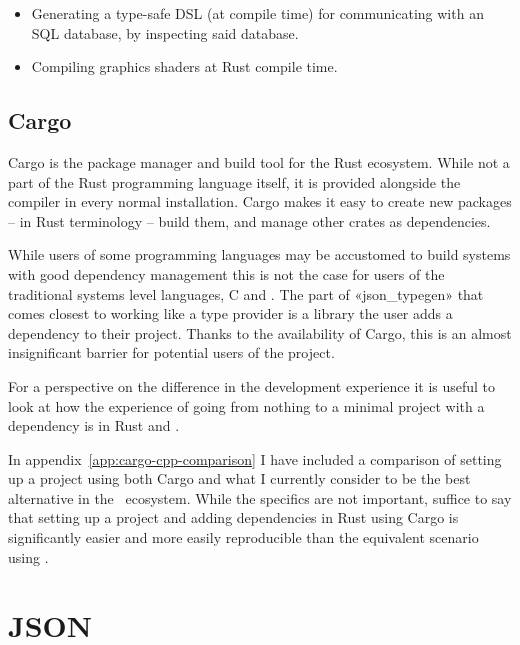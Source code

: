 \begin{itemize}
  \item Generating a type-safe DSL (at compile time) for communicating with an SQL database, by inspecting said database.\cite{diesel}
  \item Compiling graphics shaders at Rust compile time.\cite{vulkano}
\end{itemize}


\subsection{Cargo}

Cargo is the package manager and build tool for the Rust ecosystem. While not a part of the Rust programming language itself, it is provided alongside the compiler in every normal installation. Cargo makes it easy to create new packages --  in Rust terminology -- build them, and manage other crates as dependencies.

While users of some programming languages may be accustomed to build systems with good dependency management this is not the case for users of the traditional systems level languages, C and \cpp. The part of «json_typegen» that comes closest to working like a type provider is a library the user adds a dependency to their project. Thanks to the availability of Cargo, this is an almost insignificant barrier for potential users of the project.

For a perspective on the difference in the development experience it is useful to look at how the experience of going from nothing to a minimal project with a dependency is in Rust and \cpp.

In appendix~\ref{app:cargo-cpp-comparison} I have included a comparison of setting up a project using both Cargo and what I currently consider to be the best alternative in the \cpp\ ecosystem. While the specifics are not important, suffice to say that setting up a project and adding dependencies in Rust using Cargo is significantly easier and more easily reproducible than the equivalent scenario using \cpp.


\section{JSON}
\label{sec:json}

